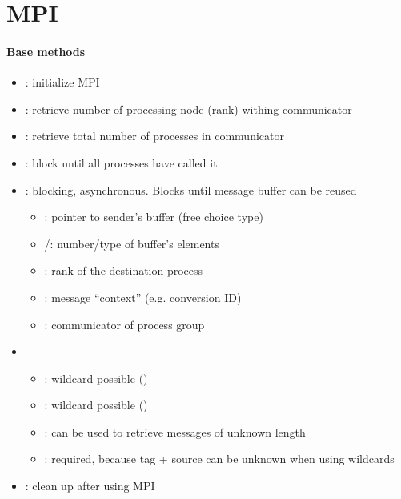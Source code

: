 \section{MPI}

\paragraph{Base methods}
\begin{itemize}
  \item {}: initialize MPI
  \item {}: retrieve number of processing node (rank) withing communicator
  \item {}: retrieve total number of processes in communicator
  \item {}: block until all processes have called it
  \item {}: blocking, asynchronous. Blocks until message buffer can be reused
  \begin{itemize}
    \item {}: pointer to sender's buffer (free choice type)
    \item {}/: number/type of buffer's elements
    \item {}: rank of the destination process
    \item {}: message ``context'' (e.g. conversion ID)
    \item {}: communicator of process group
  \end{itemize}
  \item {}
  \begin{itemize}
    \item {}: wildcard possible ()
    \item {}: wildcard possible ()
    \item {}: can be used to retrieve messages of unknown length
    \item {}: required, because tag + source can be unknown when using wildcards
  \end{itemize}
  \item {}: clean up after using MPI
\end{itemize}

